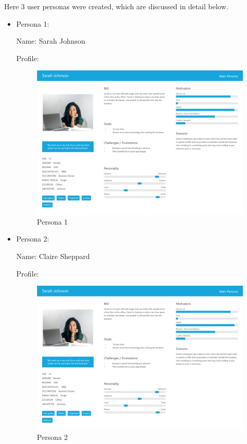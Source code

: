 \documentclass[12pt]{article}
\begin{document}
	Here 3 user personas were created, which are discussed in detail below.
	\begin{itemize}
		\item Persona 1: 
		
		Name: Sarah Johnson
		
		Profile: 
		\begin{figure}[H]
			
			\includegraphics[scale=0.2]{images/persona_1.png}
			\caption{Persona 1}
			\label{fig:persona_1}
		\end{figure}
		
		\item Persona 2:
		
		Name:  Claire Sheppard
		
		
		Profile: 
		\begin{figure}[H]
			
			\includegraphics[scale=0.2]{images/persona_1.png}
			\caption{Persona 2}
			\label{fig:persona_2}
		\end{figure}
		

\end{itemize}
\end{document}
